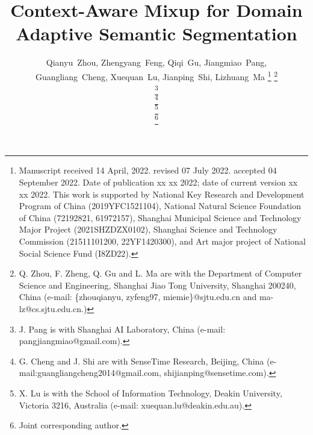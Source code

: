 \documentclass[journal]{IEEEtran}
\begin{document}
\title{Context-Aware Mixup for Domain Adaptive Semantic Segmentation}


\author{Qianyu~Zhou, 
       Zhengyang~Feng,
       Qiqi~Gu, 
       Jiangmiao~Pang, \\
       Guangliang~Cheng, 
       Xuequan~Lu, 
       Jianping~Shi, 
       Lizhuang~Ma
\thanks{Manuscript received 14 April, 2022. revised 07 July 2022. accepted
04 September 2022. Date of publication xx xx 2022; date of current version
xx xx 2022. This work is supported by National Key Research and Development Program of China (2019YFC1521104), National Natural Science Foundation of China (72192821, 61972157), Shanghai Municipal Science and Technology Major Project  (2021SHZDZX0102), Shanghai Science and Technology Commission (21511101200, 22YF1420300), and Art major project of National Social Science Fund (I8ZD22).}
\thanks{Q. Zhou, F. Zheng, Q. Gu and L. Ma are with the Department of Computer Science and Engineering, Shanghai Jiao Tong University, Shanghai 200240, China (e-mail: \{zhouqianyu, zyfeng97, miemie\}@sjtu.edu.cn and ma-lz@cs.sjtu.edu.cn.)}

\thanks{J. Pang is with Shanghai AI Laboratory, China (e-mail: pangjiangmiao@gmail.com).}

\thanks{G. Cheng and J. Shi are with SenseTime Research, Beijing, China (e-mail:guangliangcheng2014@gmail.com, shijianping@sensetime.com).}

\thanks{X. Lu is with the School of Information Technology, Deakin University,
Victoria 3216, Australia (e-mail: xuequan.lu@deakin.edu.au).}

\thanks{
 Joint corresponding author.}

}

\end{document}
